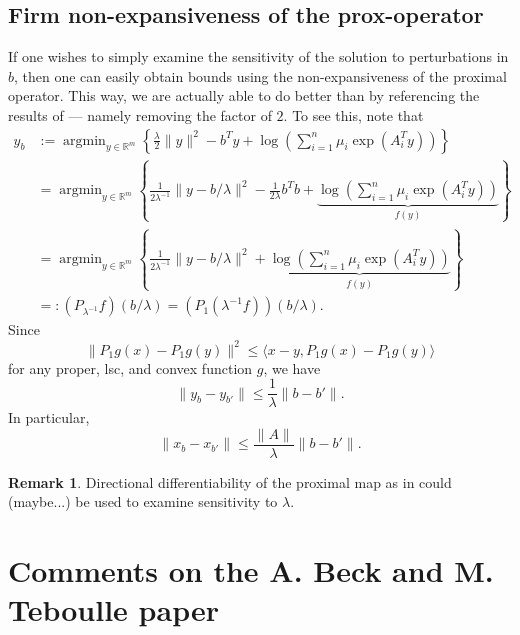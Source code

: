 \documentclass[10pt,a4paper]{article}
\numberwithin{equation}{section}
\theoremstyle{definition}
\newtheorem{remark}[theorem]{Remark}
\def\rr{{\mathbb R}}
\DeclareMathOperator{\argmin}{argmin}
\begin{document}
\subsection{Firm non-expansiveness of the prox-operator}

If one wishes to simply examine the sensitivity of the solution to perturbations in $b$, then one can easily obtain bounds using the non-expansiveness of the proximal operator. This way, we are actually able to do better than by referencing the results of \cite{Bonnans2000} --- namely removing the factor of $2$. To see this, note that 
\begin{align*}
     y_b &:= \argmin_{y \in \rr^m} \left\{ \frac{\lambda}{2} \lVert y \rVert^2 - b^Ty +  \log \left(\sum_{i=1}^n \mu_i \exp(A_i^T y)\right) \right\} \\
     &= \argmin_{y \in \rr^m} \left\{ \frac{1}{2\lambda^{-1}} \lVert y - b/\lambda \rVert^2 - \frac{1}{2 \lambda}b^Tb +  \underbrace{\log \left(\sum_{i=1}^n \mu_i \exp(A_i^T y)\right)}_{f(y)} \right\} \\
     &= \argmin_{y \in \rr^m} \left\{ \frac{1}{2\lambda^{-1}} \lVert y - b/\lambda \rVert^2 +  \underbrace{\log \left(\sum_{i=1}^n \mu_i \exp(A_i^T y)\right)}_{f(y)} \right\} \\
     &=: (P_{\lambda^{-1}}f)(b/\lambda) =  (P_1 (\lambda^{-1}f))(b/\lambda).
\end{align*}
Since 
\[
\lVert P_1g(x) - P_1g(y) \rVert^2 \leq \langle x - y,  P_1g(x) - P_1g(y) \rangle
\]
for any proper, lsc, and convex function $g$, we have 
\[
\lVert y_b - y_{b'} \rVert  \leq \frac{1}{\lambda} \rVert b - b' \rVert.
\]
In particular,
\[
\lVert x_b - x_{b'} \rVert  \leq \frac{\lVert A \rVert}{\lambda} \rVert b - b' \rVert.
\]


\begin{remark}
    Directional differentiability of the proximal map as in  \cite[Corollary 8]{friedGoodHoh2021perspective} could (maybe...) be used to examine sensitivity to $\lambda$.
\end{remark}





\section{Comments on the A. Beck and M. Teboulle paper}
\end{document}
